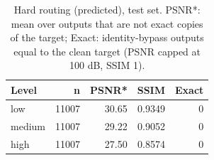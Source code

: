 \begin{table}[t]
\centering
\caption{Hard routing (predicted), test set. PSNR*: mean over outputs that are not exact copies of the target; Exact: identity-bypass outputs equal to the clean target (PSNR capped at 100 dB, SSIM 1).}
\label{tab:t2_routing_predicted_by_level}
\begin{tabular}{lrrrr}
\toprule
Level & n & PSNR* & SSIM & Exact \\
\midrule
low & 11007 & 30.65 & 0.9349 & 0 \\
medium & 11007 & 29.22 & 0.9052 & 0 \\
high & 11007 & 27.50 & 0.8574 & 0 \\
\bottomrule
\end{tabular}
\end{table}
